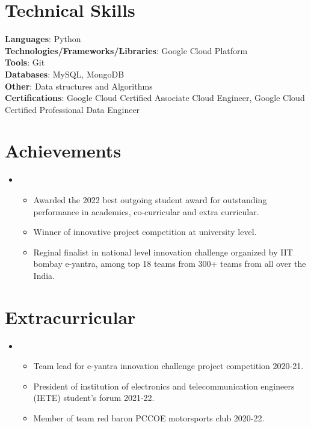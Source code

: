 \documentclass[letterpaper,11pt]{article}
\newcommand{\resumeItem}[1]{
  \item\small{
	{#1 \vspace{-2pt}}
  }
}
\newcommand{\resumeItemListStart}{\begin{itemize}}
\newcommand{\resumeItemListEnd}{\end{itemize}\vspace{-5pt}}
\begin{document}
\section{Technical Skills}
 \begin{itemize}[leftmargin=0.15in, label={}]
	\small{\item{
 	\textbf{Languages}{: Python} \\
 	\textbf{Technologies/Frameworks/Libraries}{: Google Cloud Platform } \\
 	\textbf{Tools}{: Git} \\
 	\textbf{Databases}{: MySQL, MongoDB} \\
 	\textbf{Other}{: Data structures and Algorithms} \\
	\textbf{Certifications}{: Google Cloud Certified Associate Cloud Engineer, Google Cloud Certified Professional Data Engineer} \\
	}}
 \end{itemize}
 \vspace{-16pt}


%
\section{Achievements}
\vspace{2pt}
 \begin{itemize}[leftmargin=0.15in, label={}]
 \item
	\resumeItemListStart
    	\resumeItem{Awarded the 2022 best outgoing student award for outstanding performance in academics, co-curricular and extra curricular.}
    	\resumeItem{Winner of innovative project competition at university level. }
    	\resumeItem{Reginal finalist in national level innovation challenge organized by IIT bombay e-yantra, among top 18 teams from 300+ teams from all over the India. }
  	\resumeItemListEnd
 \end{itemize}
 \vspace{-16pt}


%
\section{Extracurricular}
\vspace{2pt}
 \begin{itemize}[leftmargin=0.15in, label={}]
 \item
	\resumeItemListStart
    	\resumeItem {Team lead for e-yantra innovation challenge project competition 2020-21.}
    	\resumeItem {President of institution of electronics and telecommunication engineers (IETE) student's forum 2021-22.}
    	\resumeItem {Member of team red baron PCCOE motorsports club 2020-22.}
  	\resumeItemListEnd
 \end{itemize}
 \vspace{-16pt}
\end{document}
